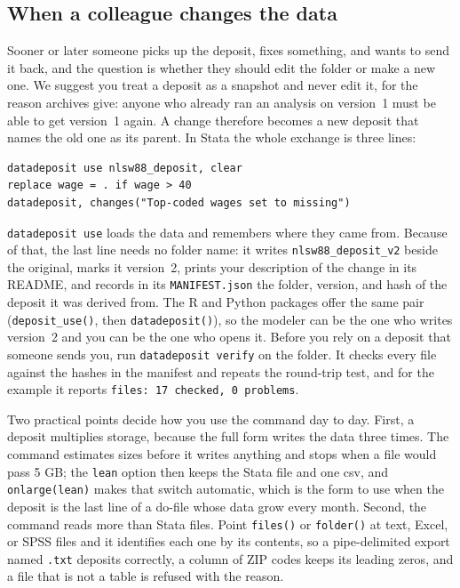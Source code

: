 \subsection{When a colleague changes the data}\label{sec:deposit-versions}
Sooner or later someone picks up the deposit, fixes something, and wants to send it back, and the question is whether they should edit the folder or make a new one. We suggest you treat a deposit as a snapshot and never edit it, for the reason archives give: anyone who already ran an analysis on version~1 must be able to get version~1 again. A change therefore becomes a new deposit that names the old one as its parent. In Stata the whole exchange is three lines:
\par
{\footnotesize
\begin{verbatim}
datadeposit use nlsw88_deposit, clear
replace wage = . if wage > 40
datadeposit, changes("Top-coded wages set to missing")
\end{verbatim}
}
\texttt{datadeposit use} loads the data and remembers where they came from. Because of that, the last line needs no folder name: it writes \texttt{nlsw88\_deposit\_v2} beside the original, marks it version~2, prints your description of the change in its README, and records in its \texttt{MANIFEST.json} the folder, version, and hash of the deposit it was derived from. The R and Python packages offer the same pair (\texttt{deposit\_use()}, then \texttt{datadeposit()}), so the modeler can be the one who writes version~2 and you can be the one who opens it. Before you rely on a deposit that someone sends you, run \texttt{datadeposit verify} on the folder. It checks every file against the hashes in the manifest and repeats the round-trip test, and for the example it reports \texttt{files: 17 checked, 0 problems}.

Two practical points decide how you use the command day to day. First, a deposit multiplies storage, because the full form writes the data three times. The command estimates sizes before it writes anything and stops when a file would pass 5 GB; the \texttt{lean} option then keeps the Stata file and one csv, and \texttt{onlarge(lean)} makes that switch automatic, which is the form to use when the deposit is the last line of a do-file whose data grow every month. Second, the command reads more than Stata files. Point \texttt{files()} or \texttt{folder()} at text, Excel, or SPSS files and it identifies each one by its contents, so a pipe-delimited export named \texttt{.txt} deposits correctly, a column of ZIP codes keeps its leading zeros, and a file that is not a table is refused with the reason.

